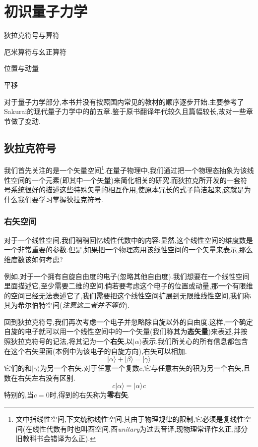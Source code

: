 \ifx\allfiles\undefined



	\else
	\fi
\chapter{初识量子力学}
\begin{introduction}
	\item 狄拉克符号与算符
	\item 厄米算符与幺正算符
	\item 位置与动量
	\item 平移
\end{introduction}
对于量子力学部分,本书并没有按照国内常见的教材的顺序逐步开始.主要参考了Sakurai的现代量子力学中的前五章.鉴于原书翻译年代较久且篇幅较长,故对一些章节做了变动.
\section{狄拉克符号}
我们首先关注的是一个矢量空间\footnote{文中指线性空间,下文统称线性空间.其由于物理规律的限制,它必须是复线性空间(在线性代数有时也叫酉空间,酉\textit{unitary}为过去音译,现物理常译作幺正,部分旧教科书会错译为么正).}.在量子物理中,我们通过把一个物理态抽象为该线性空间的一个元素(即其中一个矢量)来简化相关的研究.而狄拉克所开发的一套符号系统很好的描述这些特殊矢量的相互作用,使原本冗长的式子简洁起来,这就是为什么我们要学习掌握狄拉克符号.
\subsection{右矢空间}
对于一个线性空间,我们稍稍回忆线性代数中的内容:显然,这个线性空间的维度数是一个非常重要的参数.但是,如果把一个物理态用该线性空间的一个矢量来表示,那么维度数该如何考虑?

例如,对于一个拥有自旋自由度的电子(忽略其他自由度).我们想要在一个线性空间里面描述它,至少需要二维的空间.倘若要考虑这个电子的位置或动量,那一个有限维的空间已经无法表述它了,我们需要把这个线性空间扩展到无限维线性空间,我们称其为希尔伯特空间(\textit{注意这二者并不等价}).

回到狄拉克符号,我们再次考虑一个电子并忽略除自旋以外的自由度.这样,一个确定自旋的电子就可以用一个线性空间中的一个矢量(我们称其为\textbf{态矢量})来表述,并按照狄拉克符号的记法,将其记为一个\textbf{右矢},以$|\alpha\rangle$表示.我们所关心的所有信息都包含在这个右矢里面(本例中为该电子的自旋方向),右矢可以相加.
\begin{equation}
	|\alpha\rangle+|\beta\rangle=|\gamma\rangle 
\end{equation}
它们的和$|\gamma\rangle$为另一个右矢.对于任意一个复数$c$,它与任意右矢的积为另一个右矢,且数在右矢左右没有区别.
\begin{equation}
	c|\alpha\rangle=|\alpha\rangle c
\end{equation}
特别的,当$c=0$时,得到的右矢称为\textbf{零右矢}.

